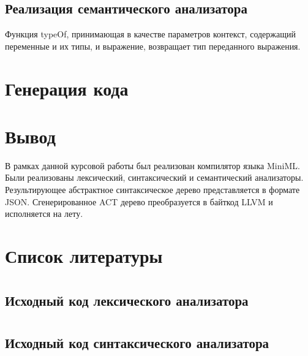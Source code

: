 \documentclass[a4paper,12pt]{article}
\numberwithin{equation}{section}
\begin{document}
\subsection{Реализация семантического анализатора}
Функция typeOf, принимающая в качестве параметров контекст,
содержащий переменные и их типы, и выражение, возвращает тип
переданного выражения.

\section{Генерация кода}


\section{Вывод}
В рамках данной курсовой работы был реализован компилятор
языка MiniML. Были реализованы лексический, синтаксический и
семантический анализаторы. Результирующее абстрактное синтаксическое
дерево представляется в формате JSON. Сгенерированное ACT дерево преобразуется
в байткод LLVM и исполняется на лету.

\section{Список литературы}
\printbibliography[heading=none]

\section*{}
\subsection*{Исходный код лексического анализатора}

\clearpage

\section*{}
\subsection*{Исходный код синтаксического анализатора}

\clearpage

\section*{}
\end{document}
